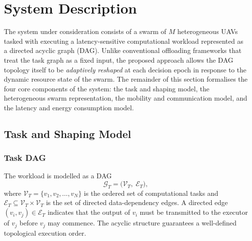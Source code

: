 
\section{System Description}
\label{sec:system}

The system under consideration consists of a swarm of $M$
heterogeneous UAVs tasked with executing a latency-sensitive
computational workload represented as a directed acyclic graph (DAG).
Unlike conventional offloading frameworks that treat the task graph
as a fixed input, the proposed approach allows the DAG topology itself
to be \emph{adaptively reshaped} at each decision epoch in response
to the dynamic resource state of the swarm.
The remainder of this section formalises the four core components of
the system: the task and shaping model, the heterogeneous swarm
representation, the mobility and communication model, and the latency
and energy consumption model.

\subsection{Task and Shaping Model}
\label{subsec:task_shaping}

\subsubsection*{Task DAG}

The workload is modelled as a DAG
\begin{equation}
  \mathcal{G}_T = \bigl(\mathcal{V}_T,\;\mathcal{E}_T\bigr),
  \label{eq:task_dag}
\end{equation}
where $\mathcal{V}_T = \{v_1, v_2, \ldots, v_N\}$ is the ordered set
of computational tasks and
$\mathcal{E}_T \subseteq \mathcal{V}_T \times \mathcal{V}_T$ is the
set of directed data-dependency edges.
A directed edge $(v_i, v_j) \in \mathcal{E}_T$ indicates that the
output of $v_i$ must be transmitted to the executor of $v_j$ before
$v_j$ may commence.
The acyclic structure guarantees a well-defined topological execution
order.

